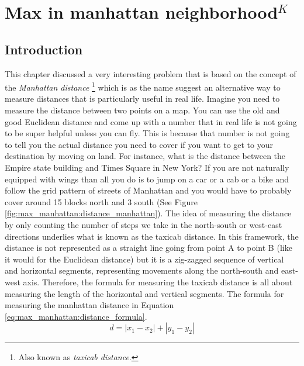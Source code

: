 %



\chapter{Max in manhattan neighborhood$^{K}$}
\label{ch:max_manhattan}

\section*{Introduction}

This chapter discussed a very interesting problem that is based on the concept of the
\textit{Manhattan distance} \footnote{Also known as \textit{taxicab distance}.} which is as the name
suggest an alternative way to measure distances that is particularly useful in real life. Imagine
you need to measure the distance between two points on a map. You can use the old and good Euclidean
distance and come up with a number that in real life is not going to be super helpful unless you can fly. This is because that number is not going to tell you the actual distance you need to
cover if you want to get to your destination by moving on land. For instance, what is the distance
between the Empire state building and Times Square in New York? If you are not naturally equipped
with wings than all you do is to jump on a car or a cab or a bike and follow the grid pattern of
streets of Manhattan and you would have to probably cover around 15 blocks north and 3 south (See
Figure \ref{fig:max_manhattan:distance_manhattan}). The idea of measuring the distance by only
counting the number of steps we take in the north-south or west-east directions underlies what is
known as the taxicab distance. In this framework, the distance is not represented as a straight line
going from point A to point B (like it would for the Euclidean distance) but it is a zig-zagged
sequence of vertical and horizontal segments, representing movements along the north-south and
east-west axis. Therefore, the formula for measuring the taxicab distance is all about measuring
the length of the horizontal and vertical segments. The formula for measuring the manhattan distance in
Equation \ref{eq:max_manhattan:distance_formula}.
\begin{equation}
    d = |x_1-x_2|+|y_1-y_2|
    \label{eq:max_manhattan:distance_formula}
\end{equation}

